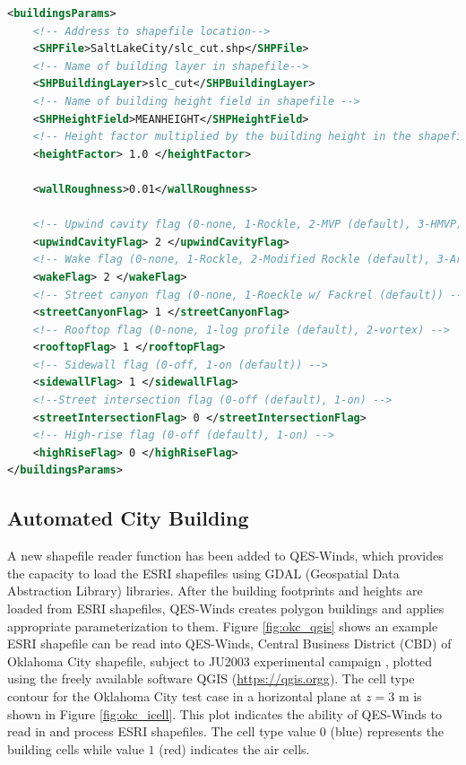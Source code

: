 \begin{lstlisting}[language=XML]
<buildingsParams>
    <!-- Address to shapefile location-->
    <SHPFile>SaltLakeCity/slc_cut.shp</SHPFile>	 
    <!-- Name of building layer in shapefile-->                       
    <SHPBuildingLayer>slc_cut</SHPBuildingLayer>     
    <!-- Name of building height field in shapefile -->                     
    <SHPHeightField>MEANHEIGHT</SHPHeightField>      
    <!-- Height factor multiplied by the building height in the shapefile (default = 1.0)-->                    
    <heightFactor> 1.0 </heightFactor>	
    
    <wallRoughness>0.01</wallRoughness>
    
    <!-- Upwind cavity flag (0-none, 1-Rockle, 2-MVP (default), 3-HMVP) -->
    <upwindCavityFlag> 2 </upwindCavityFlag> 	
    <!-- Wake flag (0-none, 1-Rockle, 2-Modified Rockle (default), 3-Area Scaled) -->		
    <wakeFlag> 2 </wakeFlag>
    <!-- Street canyon flag (0-none, 1-Roeckle w/ Fackrel (default)) -->		
    <streetCanyonFlag> 1 </streetCanyonFlag> 	   
    <!-- Rooftop flag (0-none, 1-log profile (default), 2-vortex) -->
    <rooftopFlag> 1 </rooftopFlag> 
    <!-- Sidewall flag (0-off, 1-on (default)) -->           
    <sidewallFlag> 1 </sidewallFlag> 		
    <!--Street intersection flag (0-off (default), 1-on) -->		
    <streetIntersectionFlag> 0 </streetIntersectionFlag> 					
	<!-- High-rise flag (0-off (default), 1-on) -->
    <highRiseFlag> 0 </highRiseFlag> 
</buildingsParams>
\end{lstlisting}

\subsection{Automated City Building}

A new shapefile reader function has been added to QES-Winds, which provides the capacity to load the ESRI shapefiles using GDAL (Geospatial Data Abstraction Library) libraries. After the building footprints and heights are loaded from ESRI shapefiles, QES-Winds creates polygon buildings and applies appropriate parameterization to them. Figure \ref{fig:okc_qgis} shows an example ESRI shapefile can be read into QES-Winds, Central Business District (CBD) of Oklahoma City shapefile, subject to JU2003 experimental campaign \cite{allwine2006joint}, plotted using the freely available software QGIS (\href{https://qgis.org}{https://qgis.orgg}). The cell type contour for the Oklahoma City test case in a horizontal plane at $z=3$ m is shown in Figure \ref{fig:okc_icell}. This plot indicates the ability of QES-Winds to read in and process ESRI shapefiles. The cell type value $0$ (blue) represents the building cells while value $1$ (red) indicates the air cells.

